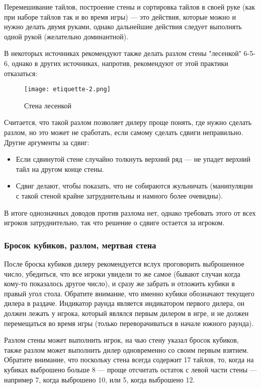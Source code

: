 Перемешивание тайлов, построение стены и сортировка тайлов в своей руке (как при наборе тайлов так и во время игры) --- это действия, которые можно и нужно делать двумя руками, однако дальнейшие действия следует выполнять одной рукой (желательно доминантной).

В некоторых источниках рекомендуют также делать разлом стены "лесенкой" 6-5-6, однако в других источниках, напротив, рекомендуют от этой практики отказаться:

\begin{figure}[H]
	\centering
	\texttt{[image: etiquette-2.png]}
	\caption{Стена лесенкой}
\end{figure}

Считается, что такой разлом позволяет дилеру проще понять, где нужно сделать разлом, но это может не сработать, если самому сделать сдвиги неправильно. Другие аргументы за сдвиг:
\begin{itemize}
	\item Если сдвинутой стене случайно толкнуть верхний ряд --- не упадет верхний тайл на другом конце стены.
	\item Сдвиг делают, чтобы показать, что не собираются жульничать (манипуляции с такой стеной крайне затруднительны и намного более очевидны).
\end{itemize} 
В итоге однозначных доводов против разлома нет, однако требовать этого от всех игроков затруднительно, так что решение о сдвиге остается за игроком.

\subsubsection{Бросок кубиков, разлом, мертвая стена}

После броска кубиков дилеру рекомендуется вслух проговорить выброшенное число, убедиться, что все игроки увидели то же самое (бывают случаи когда кому-то показалось другое число), и сразу же забрать и отложить кубики в правый угол стола. Обратите внимание, что именно кубики обозначают текущего дилера в раздаче. Индикатор раунда является индикатором первого дилера, он должен лежать у игрока, который являлся первым дилером в игре, и не должен перемещаться во время игры (только переворачиваться в начале южного раунда). 

Разлом стены может выполнить игрок, на чью стену указал бросок кубиков, также разлом может выполнить дилер одновременно со своим первым взятием. Обратите внимание, что поскольку стена всегда содержит 17 тайлов, то, когда на кубиках выброшено больше 8 --- проще отсчитать остаток с левой части стены --- например 7, когда выброшено 10, или 5, когда выброшено 12. 

